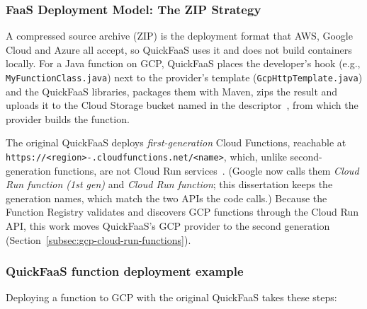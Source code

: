 \subsubsection{FaaS Deployment Model: The ZIP Strategy}
A compressed source archive (ZIP) is the deployment format that AWS, Google Cloud and Azure all
accept, so QuickFaaS uses it and does not build containers locally. For a Java function on GCP,
QuickFaaS places the developer's hook (e.g., \texttt{MyFunctionClass.java}) next to the provider's
template (\texttt{GcpHttpTemplate.java}) and the QuickFaaS libraries, packages them with Maven,
zips the result and uploads it to the Cloud Storage bucket named in the
descriptor~\cite{GCP_bucket}, from which the provider builds the function.

The original QuickFaaS deploys \emph{first-generation} Cloud Functions, reachable at
\texttt{https://\allowbreak <region>-.\allowbreak cloudfunctions.\allowbreak net/\allowbreak <name>},
which, unlike second-generation functions, are not Cloud Run
services~\cite{gcpFunctionsVersionComparison}. (Google now calls them \emph{Cloud Run function
(1st gen)} and \emph{Cloud Run function}; this dissertation keeps the generation names, which
match the two APIs the code calls.) Because the Function Registry validates and discovers GCP
functions through the Cloud Run API, this work moves QuickFaaS's GCP provider to the second
generation (Section~\ref{subsec:gcp-cloud-run-functions}).

\subsubsection{QuickFaaS function deployment example}
\label{subsec:quickfaas-example}
Deploying a function to GCP with the original QuickFaaS takes these steps:

